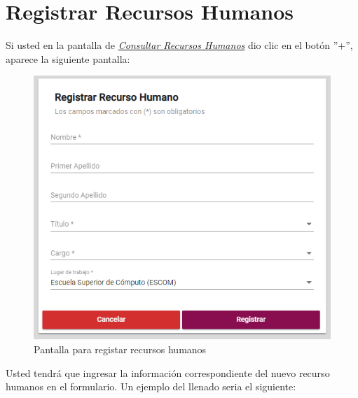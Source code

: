 


    \newpage
        \hypertarget{registrarRH}{}
        \section{Registrar Recursos Humanos}
            Si usted  en la pantalla de \hyperlink{consultarRH}{\textit{Consultar Recursos Humanos}} dio clic en el botón ''+'', aparece la siguiente pantalla:

            \begin{figure}[H]
                \centering
                \hypertarget{registrarUs}{\includegraphics[width=0.7\linewidth]{images/SP1/RegistrarRH}}
                \caption{Pantalla para registar recursos humanos}
                \label{registrarrh}
            \end{figure}

            Usted tendrá que ingresar la información correspondiente del nuevo recurso humanos en el formulario. Un ejemplo del llenado seria el siguiente:

